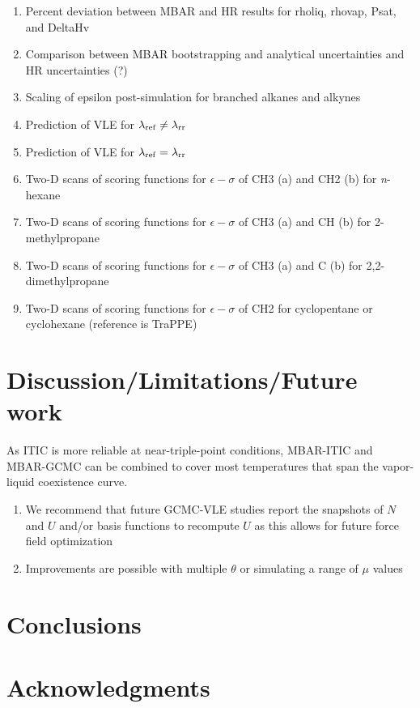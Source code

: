 \documentclass[journal=jced,manuscript=article]{achemso}
\begin{document}
\begin{enumerate}
	\item Percent deviation between MBAR and HR results for rholiq, rhovap, Psat, and DeltaHv
	\item Comparison between MBAR bootstrapping and analytical uncertainties and HR uncertainties (?)
	\item Scaling of epsilon post-simulation for branched alkanes and alkynes
	\item Prediction of VLE for $\lambda_{\rm ref} \neq \lambda_{\rm rr}$
	\item Prediction of VLE for $\lambda_{\rm ref} = \lambda_{\rm rr}$
	\item Two-D scans of scoring functions for $\epsilon-\sigma$ of CH3 (a) and CH2 (b) for \textit{n}-hexane
	\item Two-D scans of scoring functions for $\epsilon-\sigma$ of CH3 (a) and CH (b) for 2-methylpropane
	\item Two-D scans of scoring functions for $\epsilon-\sigma$ of CH3 (a) and C (b) for 2,2-dimethylpropane
	\item Two-D scans of scoring functions for $\epsilon-\sigma$ of CH2 for cyclopentane or cyclohexane (reference is TraPPE)
\end{enumerate}

\section{Discussion/Limitations/Future work} \label{sec: Discussion}

As ITIC is more reliable at near-triple-point conditions, MBAR-ITIC and MBAR-GCMC can be combined to cover most temperatures that span the vapor-liquid coexistence curve.

\begin{enumerate}
	\item We recommend that future GCMC-VLE studies report the snapshots of $N$ and $U$ and/or basis functions to recompute $U$ as this allows for future force field optimization
	\item Improvements are possible with multiple $\theta$ or simulating a range of $\mu$ values
\end{enumerate}

\section{Conclusions} \label{sec: Conclusions}

\section{Acknowledgments}
\end{document}
